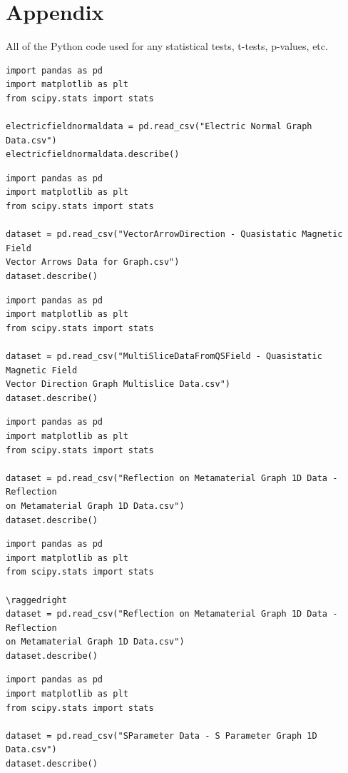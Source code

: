 \documentclass[]{article}
\begin{document}
\section*{Appendix}
All of the Python code used for any statistical tests, t-tests, p-values, etc.
\begin{lstlisting}
import pandas as pd
import matplotlib as plt
from scipy.stats import stats

electricfieldnormaldata = pd.read_csv("Electric Normal Graph Data.csv")
electricfieldnormaldata.describe()
\end{lstlisting}
\begin{lstlisting}
import pandas as pd
import matplotlib as plt
from scipy.stats import stats

dataset = pd.read_csv("VectorArrowDirection - Quasistatic Magnetic Field 
Vector Arrows Data for Graph.csv")
dataset.describe()
\end{lstlisting}
\begin{lstlisting}
import pandas as pd
import matplotlib as plt
from scipy.stats import stats

dataset = pd.read_csv("MultiSliceDataFromQSField - Quasistatic Magnetic Field 
Vector Direction Graph Multislice Data.csv")
dataset.describe()
\end{lstlisting}
\begin{lstlisting}
import pandas as pd
import matplotlib as plt
from scipy.stats import stats

dataset = pd.read_csv("Reflection on Metamaterial Graph 1D Data - Reflection 
on Metamaterial Graph 1D Data.csv")
dataset.describe()
\end{lstlisting}
\begin{lstlisting}
import pandas as pd
import matplotlib as plt
from scipy.stats import stats

\raggedright
dataset = pd.read_csv("Reflection on Metamaterial Graph 1D Data - Reflection 
on Metamaterial Graph 1D Data.csv")
dataset.describe()
\end{lstlisting}
\begin{lstlisting}
import pandas as pd
import matplotlib as plt
from scipy.stats import stats

dataset = pd.read_csv("SParameter Data - S Parameter Graph 1D Data.csv")
dataset.describe()
\end{lstlisting}
\end{document}
